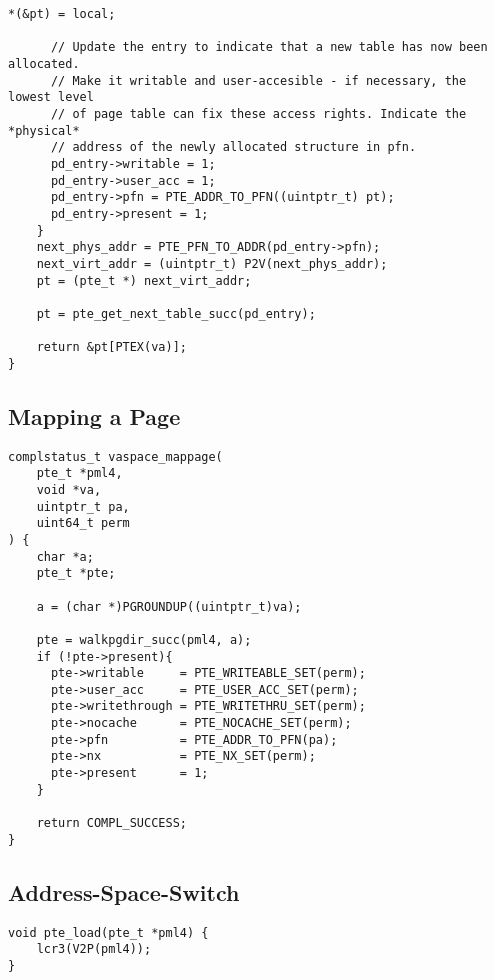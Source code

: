 \begin{lstlisting}[caption={Page-Table-Entry Library for Page-Table Traversal},label={cpagetablewalk},style=CStyle]
      *(&pt) = local;

      // Update the entry to indicate that a new table has now been allocated.
      // Make it writable and user-accesible - if necessary, the lowest level
      // of page table can fix these access rights. Indicate the *physical*
      // address of the newly allocated structure in pfn.
      pd_entry->writable = 1;
      pd_entry->user_acc = 1;
      pd_entry->pfn = PTE_ADDR_TO_PFN((uintptr_t) pt);
      pd_entry->present = 1;
    }
    next_phys_addr = PTE_PFN_TO_ADDR(pd_entry->pfn);
    next_virt_addr = (uintptr_t) P2V(next_phys_addr);
    pt = (pte_t *) next_virt_addr;
    
    pt = pte_get_next_table_succ(pd_entry);

    return &pt[PTEX(va)];
}
\end{lstlisting}

\subsection{Mapping a Page}
\label{sec:cmapapage}

\begin{lstlisting}[caption={Mapping a Single Page},label={cmapapage},style=CStyle]
complstatus_t vaspace_mappage(
    pte_t *pml4,
    void *va,
    uintptr_t pa,
    uint64_t perm
) {
    char *a;
    pte_t *pte;

    a = (char *)PGROUNDUP((uintptr_t)va);
    
    pte = walkpgdir_succ(pml4, a);
    if (!pte->present){
      pte->writable     = PTE_WRITEABLE_SET(perm);
      pte->user_acc     = PTE_USER_ACC_SET(perm);
      pte->writethrough = PTE_WRITETHRU_SET(perm);
      pte->nocache      = PTE_NOCACHE_SET(perm);
      pte->pfn          = PTE_ADDR_TO_PFN(pa);
      pte->nx           = PTE_NX_SET(perm);
      pte->present      = 1;
    }

    return COMPL_SUCCESS;
}
\end{lstlisting}


\subsection{Address-Space-Switch}
\label{sec:caspaceswitch}

\begin{lstlisting}[caption={Loading \textsf{cr3} for Address-Space Switch},label={caspace},style=CStyle]
void pte_load(pte_t *pml4) {
    lcr3(V2P(pml4));
}
\end{lstlisting}
